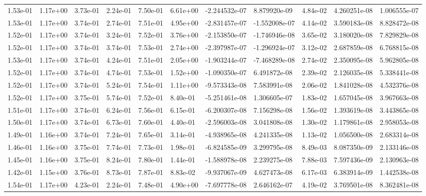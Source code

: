 \begin{longtable}{| p{} | p{} |}
1.53e-01 & 1.17e+00 & 3.73e-01 & 2.24e-01 & 7.50e-01 & 6.61e+00 & -2.244532e-07 &  8.879920e-09 &  4.84e-02 &  4.260251e-08 &  1.006555e-07 \\
1.53e-01 & 1.17e+00 & 3.74e-01 & 2.74e-01 & 7.51e-01 & 4.95e+00 & -2.831457e-07 & -1.552008e-07 &  4.14e-02 &  3.590183e-08 &  8.828472e-08 \\
1.52e-01 & 1.17e+00 & 3.74e-01 & 3.24e-01 & 7.52e-01 & 3.76e+00 & -2.153850e-07 & -1.746946e-08 &  3.65e-02 &  3.180020e-08 &  7.829829e-08 \\
1.52e-01 & 1.17e+00 & 3.74e-01 & 3.74e-01 & 7.53e-01 & 2.74e+00 & -2.397987e-07 & -1.296924e-07 &  3.12e-02 &  2.687859e-08 &  6.768815e-08 \\
1.53e-01 & 1.17e+00 & 3.74e-01 & 4.24e-01 & 7.51e-01 & 2.05e+00 & -1.903244e-07 & -7.468289e-08 &  2.74e-02 &  2.350095e-08 &  5.962805e-08 \\
1.52e-01 & 1.17e+00 & 3.74e-01 & 4.74e-01 & 7.53e-01 & 1.52e+00 & -1.090350e-07 &  6.491872e-08 &  2.39e-02 &  2.126035e-08 &  5.338441e-08 \\
1.52e-01 & 1.17e+00 & 3.74e-01 & 5.24e-01 & 7.54e-01 & 1.11e+00 & -9.573343e-08 &  7.583991e-08 &  2.06e-02 &  1.841028e-08 &  4.532376e-08 \\
1.52e-01 & 1.17e+00 & 3.75e-01 & 5.74e-01 & 7.52e-01 & 8.40e-01 & -5.251461e-08 &  1.306605e-07 &  1.83e-02 &  1.657045e-08 &  3.967663e-08 \\
1.51e-01 & 1.17e+00 & 3.74e-01 & 6.24e-01 & 7.56e-01 & 6.15e-01 & -6.200307e-08 &  7.156298e-08 &  1.56e-02 &  1.393619e-08 &  3.443865e-08 \\
1.50e-01 & 1.17e+00 & 3.74e-01 & 6.73e-01 & 7.60e-01 & 4.40e-01 & -2.596003e-08 &  3.041808e-08 &  1.30e-02 &  1.179861e-08 &  2.958053e-08 \\
1.49e-01 & 1.16e+00 & 3.74e-01 & 7.24e-01 & 7.65e-01 & 3.14e-01 & -4.938965e-08 &  4.241335e-08 &  1.13e-02 &  1.056500e-08 &  2.683314e-08 \\
1.46e-01 & 1.16e+00 & 3.75e-01 & 7.74e-01 & 7.73e-01 & 1.98e-01 & -6.824585e-09 &  3.299795e-08 &  8.49e-03 &  8.087350e-09 &  2.133146e-08 \\
1.45e-01 & 1.16e+00 & 3.75e-01 & 8.24e-01 & 7.80e-01 & 1.44e-01 & -1.588978e-08 &  2.239275e-08 &  7.88e-03 &  7.597436e-09 &  2.130963e-08 \\
1.42e-01 & 1.15e+00 & 3.76e-01 & 8.73e-01 & 7.87e-01 & 8.83e-02 & -9.937067e-09 &  4.627473e-08 &  6.17e-03 &  6.383914e-09 &  1.442538e-08 \\
1.54e-01 & 1.17e+00 & 4.23e-01 & 2.24e-01 & 7.48e-01 & 4.90e+00 & -7.697778e-08 &  2.646162e-07 &  4.19e-02 &  3.769501e-08 &  8.362481e-08 \\

\end{longtable}
